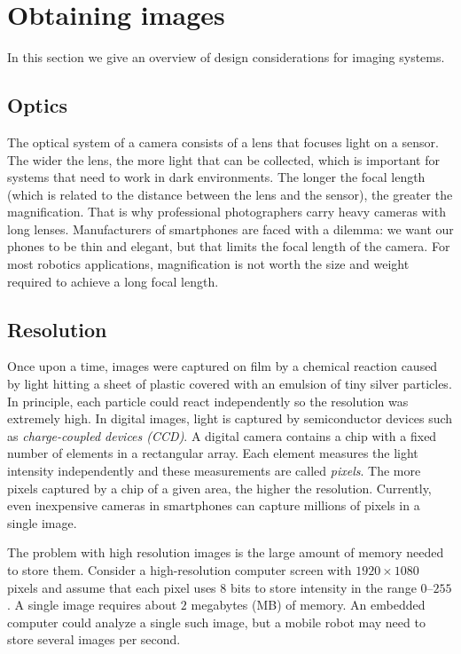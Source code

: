 \section{Obtaining images}\label{s.obtaining-images}

In this section we give an overview of design considerations for imaging systems.

\subsection*{Optics}

The optical system of a camera consists of a lens that focuses light on a sensor. The wider the lens, the more light that can be collected, which is important for systems that need to work in dark environments. The longer the focal length (which is related to the distance between the lens and the sensor), the greater the magnification. That is why professional photographers carry heavy cameras with long lenses. Manufacturers of smartphones are faced with a dilemma: we want our phones to be thin and elegant, but that limits the focal length of the camera. For most robotics applications, magnification is not worth the size and weight required to achieve a long focal length.

\subsection*{Resolution}

Once upon a time, images were captured on film by a chemical reaction caused by light hitting a sheet of plastic covered with an emulsion of tiny silver particles. In principle, each particle could react independently so the resolution was extremely high. In digital images, light is captured by semiconductor devices such as \emph{charge-coupled devices (CCD)}. A digital camera contains a chip with a fixed number of elements in a rectangular array. Each element measures the light intensity independently and these measurements are called \emph{pixels}. The more pixels captured by a chip of a given area, the higher the resolution. Currently, even inexpensive cameras in smartphones can capture millions of pixels in a single image.

The problem with high resolution images is the large amount of memory needed to store them. Consider a high-resolution computer screen with $1920\times 1080$ pixels and assume that each pixel uses $8$ bits to store intensity in the range $0$--$255$. A single image requires about $2$ megabytes (MB) of memory. An embedded computer could analyze a single such image, but a mobile robot may need to store several images per second.

